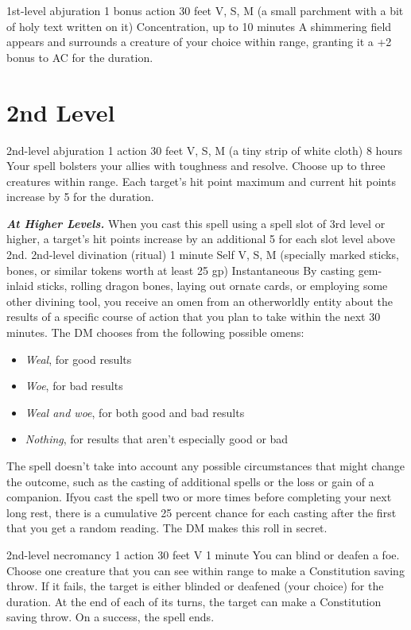 \documentclass[10pt,twoside,twocolumn,openany]{book}
\newcommand\impact[1]{
	\textbf{\textit{#1}}
}
\begin{document}
{1st-level abjuration}
{\color{bonusaction}1 bonus action}
{30 feet}
{V, S, M (a small parchment with a bit of holy text written on it)}
{{\color{concentration}Concentration}, up to 10 minutes}
%
A shimmering field appears and surrounds a creature of your choice within range, granting it a +2 bonus to AC for the duration.

\clearpage
\section{2nd Level}
{2nd-level abjuration}
{\color{action}1 action}
{30 feet}
{V, S, M (a tiny strip of white cloth)}
{8 hours}
%
Your spell bolsters your allies with toughness and resolve. Choose up to three creatures within range. Each target's hit point maximum and current hit points increase by 5 for the duration.

\impact{At Higher Levels.} When you cast this spell using
a spell slot of 3rd level or higher, a target's hit points increase by an additional 5 for each slot level above 2nd.
\newpage
{}
{2nd-level divination {\color{ritual}(ritual)}}
{1 minute}
{Self}
{V, S, M (specially marked sticks, bones, or similar tokens worth at least {\color{cost}25 gp})}
{Instantaneous}
%
By casting gem-inlaid sticks, rolling dragon bones, laying out ornate cards, or employing some other divining tool, you receive an omen from an otherworldly entity about the results of a specific course of action that you plan to take within the next 30 minutes. The DM chooses from the following possible omens:
\begin{itemize}
  \item \emph{Weal}, for good results
  \item \emph{Woe}, for bad results
  \item \emph{Weal and woe}, for both good and bad results
  \item \emph{Nothing}, for results that aren't especially good or bad
\end{itemize}
The spell doesn't take into account any possible circumstances that might change the outcome, such as the casting of additional spells or the loss or gain of a companion.
Ifyou cast the spell two or more times before completing your next long rest, there is a cumulative 25 percent chance for each casting after the first that you get a random reading. The DM makes this roll in secret.

{2nd-level necromancy}
{\color{action}1 action}
{30 feet}
{V}
{1 minute}
%
You can blind or deafen a foe. Choose one creature that you can see within range to make a Constitution saving throw. If it fails, the target is either blinded or deafened (your choice) for the duration. At the end of each of its turns, the target can make a Constitution saving throw. On a success, the spell ends.
\end{document}
